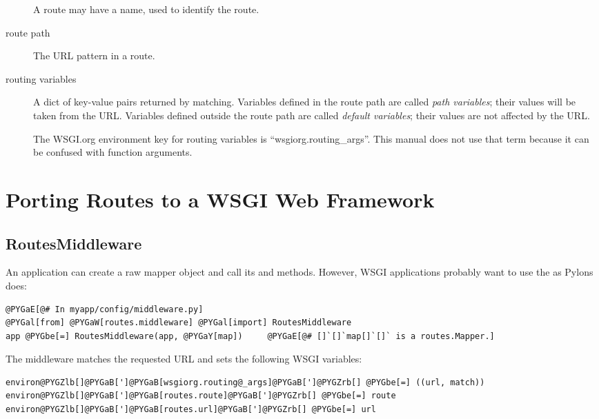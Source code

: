 \documentclass[letterpaper,10pt,english]{manual}
\begin{document}
\begin{description}
A route may have a name, used to identify the route.

\item[route path]\hypertarget{term-route-path}{}
The URL pattern in a route.

\item[routing variables]\hypertarget{term-routing-variables}{}
A dict of key-value pairs returned by matching.  Variables defined in
the route path are called \emph{path variables}; their values will be taken
from the URL.  Variables defined outside the route path are called
\emph{default variables}; their values are not affected by the URL.

The WSGI.org environment key for routing variables is
``wsgiorg.routing\_args''.  This manual does not use that term because it
can be confused with function arguments.

\end{description}

\resetcurrentobjects
\hypertarget{--doc-porting}{}

\chapter{Porting Routes to a WSGI Web Framework}


\section{RoutesMiddleware}

An application can create a raw mapper object and call its  and
 methods.  However, WSGI applications probably want to use
the  as Pylons does:

\begin{Verbatim}[commandchars=@\[\]]
@PYGaE[@# In myapp/config/middleware.py]
@PYGal[from] @PYGaW[routes.middleware] @PYGal[import] RoutesMiddleware
app @PYGbe[=] RoutesMiddleware(app, @PYGaY[map])     @PYGaE[@# []`[]`map[]`[]` is a routes.Mapper.]
\end{Verbatim}

The middleware matches the requested URL and sets the following WSGI
variables:

\begin{Verbatim}[commandchars=@\[\]]
environ@PYGZlb[]@PYGaB[']@PYGaB[wsgiorg.routing@_args]@PYGaB[']@PYGZrb[] @PYGbe[=] ((url, match))
environ@PYGZlb[]@PYGaB[']@PYGaB[routes.route]@PYGaB[']@PYGZrb[] @PYGbe[=] route
environ@PYGZlb[]@PYGaB[']@PYGaB[routes.url]@PYGaB[']@PYGZrb[] @PYGbe[=] url
\end{Verbatim}
\end{document}
